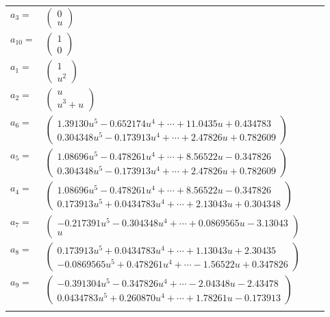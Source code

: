 \documentclass[1p]{elsarticle_modified}
\theoremstyle{definition}
\begin{document}
\begin{tabular}{m{7pt} m{180pt} m{7pt} m{180pt} }
\flushright $a_{3}=$&$\begin{pmatrix}0\\u\end{pmatrix}$ \\
\flushright $a_{10}=$&$\begin{pmatrix}1\\0\end{pmatrix}$ \\
\flushright $a_{1}=$&$\begin{pmatrix}1\\u^2\end{pmatrix}$ \\
\flushright $a_{2}=$&$\begin{pmatrix}u\\u^3+u\end{pmatrix}$ \\
\flushright $a_{6}=$&$\begin{pmatrix}1.39130 u^{5}-0.652174 u^{4}+\cdots+11.0435 u+0.434783\\0.304348 u^{5}-0.173913 u^{4}+\cdots+2.47826 u+0.782609\end{pmatrix}$ \\
\flushright $a_{5}=$&$\begin{pmatrix}1.08696 u^{5}-0.478261 u^{4}+\cdots+8.56522 u-0.347826\\0.304348 u^{5}-0.173913 u^{4}+\cdots+2.47826 u+0.782609\end{pmatrix}$ \\
\flushright $a_{4}=$&$\begin{pmatrix}1.08696 u^{5}-0.478261 u^{4}+\cdots+8.56522 u-0.347826\\0.173913 u^{5}+0.0434783 u^{4}+\cdots+2.13043 u+0.304348\end{pmatrix}$ \\
\flushright $a_{7}=$&$\begin{pmatrix}-0.217391 u^{5}-0.304348 u^{4}+\cdots+0.0869565 u-3.13043\\u\end{pmatrix}$ \\
\flushright $a_{8}=$&$\begin{pmatrix}0.173913 u^{5}+0.0434783 u^{4}+\cdots+1.13043 u+2.30435\\-0.0869565 u^{5}+0.478261 u^{4}+\cdots-1.56522 u+0.347826\end{pmatrix}$ \\
\flushright $a_{9}=$&$\begin{pmatrix}-0.391304 u^{5}-0.347826 u^{4}+\cdots-2.04348 u-2.43478\\0.0434783 u^{5}+0.260870 u^{4}+\cdots+1.78261 u-0.173913\end{pmatrix}$\\&\end{tabular}
\end{document}

